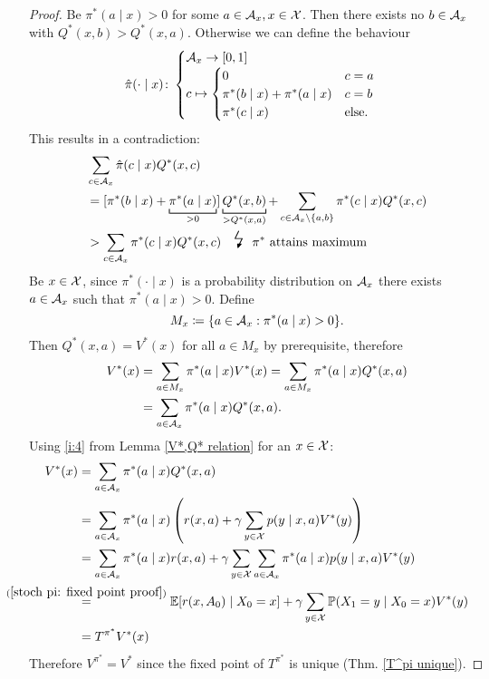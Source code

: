 \begin{proof}
	\xToy{\ref{ii:3}}{\ref{ii:4}} 
	Be \(\pi^*(a\mid x)>0\) for some \(a\in\mathcal{A}_x,x\in\mathcal{X}\). Then there exists no \(b\in\mathcal{A}_x\) with \(Q^*(x,b)>Q^*(x,a)\). Otherwise we can define the behaviour
	\[
		\hat{\pi}(\cdot\mid x)\colon
		\begin{cases}
			\mathcal{A}_x\to[0,1]\\
			c\mapsto 
			\begin{cases}
				0 & c=a \\
				\pi^*(b\mid x) + \pi^*(a\mid x) & c=b\\
				\pi^*(c\mid x) & \text{else}.
			\end{cases}
		\end{cases}
	\]
	This results in a contradiction:
	\begin{align*}
		&\sum_{c\in\cA_x} \hat{\pi}(c\mid x) Q^*(x,c)\\
		&=[\pi^*(b\mid x) %
		+ \underbracket[0.7pt]{\pi^*(a\mid x)}_{>0}] \underbracket[0.7pt]{Q^*(x,b)}_{>Q^*(x,a)}
		+\sum_{c\in\cA_x\setminus \{a,b\}} \pi^*(c\mid x)Q^*(x,c)\\
		&> \sum_{c\in\cA_x} \pi^*(c\mid x) Q^*(x,c) \contradiction{\pi^* \text{ attains maximum}}
	\end{align*}
	\xToy{\ref{ii:4}}{\ref{ii:2}} Be \(x\in\mathcal{X}\), since \(\pi^*(\cdot\mid x)\) is a probability distribution on \(\mathcal{A}_x\) there exists \(a\in\mathcal{A}_x\) such that \(\pi^*(a\mid x)>0\). Define
	\[
		M_x\coloneqq \{a\in\mathcal{A}_x:\pi^*(a\mid x)>0 \}.
	\]
	Then \(Q^*(x,a)=V^*(x)\) for all \(a\in M_x\) by prerequisite, therefore
	\begin{align*}
		V^*(x)&= \sum_{a\in M_x} \pi^*(a\mid x) V^*(x) 
		= \sum_{a\in M_x} \pi^*(a\mid x)Q^*(x,a)\\
		&=\sum_{a\in \mathcal{A}_x} \pi^*(a\mid x)Q^*(x,a).
	\end{align*}
	\xToy{\ref{ii:2}}{\ref{ii:1}} Using \ref{i:4} from Lemma \ref{V*,Q* relation} for an \(x\in\mathcal{X}\):
	\begin{align*}
		V^*(x)&=\sum_{a\in \cA_x} \pi^*(a\mid x)Q^*(x,a)\\
		&=\sum_{a\in \cA_x} \pi^*(a\mid x) 
		\left(r(x,a)+\gamma \sum\limits_{y\in\cX}p(y\mid x,a) V^*(y)\right)\\
		&=\sum_{a\in \cA_x}\pi^*(a\mid x)r(x,a)
		+\gamma \sum_{y\in\cX} \sum_{a\in\cA_x}\pi^*(a\mid x)p(y\mid x,a)V^*(y)\\
		&\lxeq{(\ref{stoch pi: fixed point proof})}\E[r(x,A_0)\mid X_0=x] 
		+ \gamma \sum_{y\in\cX}\Pr(X_1=y\mid X_0 =x) V^*(y)\\
		&=T^{\pi^*} V^*(x)
	\end{align*}
	Therefore \(V^{\pi^*} = V^*\) since the fixed point of \(T^{\pi^*}\) is unique (Thm. \ref{T^pi unique}).
\end{proof}
